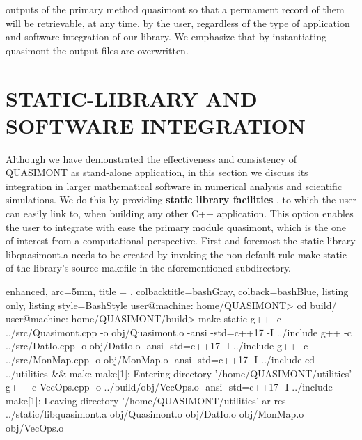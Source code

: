 \documentclass[a4paper, twosided]{book}
\begin{document}
outputs of the primary method \colorbox{poliGrayBlue}{quasimont} so that a permament record of them will be retrievable, at any time, by the user, regardless of the type of application and software integration of our library. We emphasize that by instantiating \colorbox{poliGrayBlue}{quasimont} the output files are overwritten.

\section[Static-library and software integration]{\changefont STATIC-LIBRARY AND SOFTWARE INTEGRATION}\label{Sec3.3}

\noindent
Although we have demonstrated the effectiveness and consistency of QUASIMONT as stand-alone application, in this section we discuss its integration in larger mathematical software in numerical analysis and scientific simulations. We do this by providing \color{poliDarkBlue} \textbf{static library facilities} \color{black}, to which the user can easily link to, when building any other C++ application. This option enables the user to integrate with ease the primary module \colorbox{poliGrayBlue}{quasimont}, which is the one of interest from a computational perspective. First and foremost the static library \colorbox{poliGrayBlue}{libquasimont.a} needs to be created by invoking the non-default rule \colorbox{poliGrayBlue}{make static} of the library's source \colorbox{poliGrayBlue}{makefile} in the aforementioned subdirectory.

\vspace{0.5cm}
\begin{tcblisting}{enhanced,
                   arc=5mm,
                   title = \color{black}{\large \ttfamily Creation of libquasimont static library},
                   colbacktitle=bashGray,
                   colback=bashBlue,
                   listing only,
                   listing style=BashStyle}
user@machine: home/QUASIMONT> cd build/
user@machine: home/QUASIMONT/build> make static
g++ -c ../src/Quasimont.cpp -o obj/Quasimont.o -ansi -std=c++17 -I ../include 
g++ -c ../src/DatIo.cpp -o obj/DatIo.o -ansi -std=c++17 -I ../include 
g++ -c ../src/MonMap.cpp -o obj/MonMap.o -ansi -std=c++17 -I ../include 
cd ../utilities && make
make[1]: Entering directory '/home/QUASIMONT/utilities'
g++ -c VecOps.cpp -o ../build/obj/VecOps.o -ansi -std=c++17 -I ../include 
make[1]: Leaving directory '/home/QUASIMONT/utilities'
ar rcs ../static/libquasimont.a obj/Quasimont.o obj/DatIo.o obj/MonMap.o obj/VecOps.o
\end{tcblisting}
\vspace{0.5cm}
\end{document}
